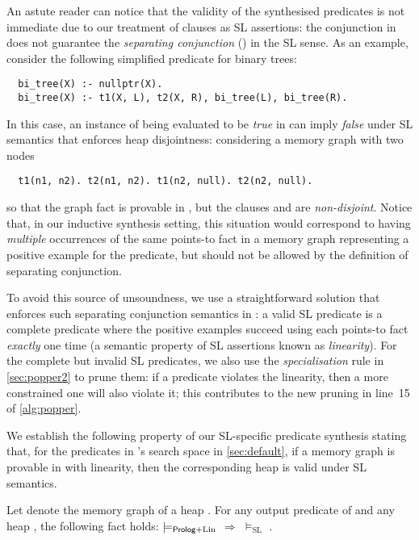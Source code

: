 An astute reader can notice that the validity of the synthesised
predicates is not immediate due to our treatment of \prolog clauses as
SL assertions: the conjunction in \prolog does not guarantee the
\emph{separating conjunction} (\pcode{*}) in the SL sense. As an
example, consider the following simplified \prolog predicate for
binary trees:
%
\begin{verbatim}
  bi_tree(X) :- nullptr(X). 
  bi_tree(X) :- t1(X, L), t2(X, R), bi_tree(L), bi_tree(R).
\end{verbatim}
%
In this case, an instance of  being evaluated to be
\emph{true} in \prolog can imply \emph{false} under SL semantics that
enforces heap disjointness: considering a memory graph with two nodes
%
\begin{verbatim}
  t1(n1, n2). t2(n1, n2). t1(n2, null). t2(n2, null).
\end{verbatim}
%
so that the graph fact  is provable in \prolog, but
the clauses  and  are
\emph{non-disjoint}.
%
Notice that, in our inductive synthesis setting, this situation would
correspond to having \emph{multiple} occurrences of the same points-to
fact in a memory graph representing a positive example for the
predicate, but should not be allowed by the definition of separating
conjunction.

To avoid this source of unsoundness, we use a straightforward solution
that enforces such separating conjunction semantics in \prolog: a
valid SL predicate is a complete \prolog predicate where the positive
examples succeed using each points-to fact \emph{exactly} one time (a
semantic property of SL assertions known as \emph{linearity}).
%
For the complete \prolog but invalid SL predicates, we also use the
\textit{specialisation} rule in \autoref{sec:popper2} to prune them:
if a predicate violates the linearity, then a more constrained one
will also violate it; this contributes to the new pruning in
line~15 of \autoref{alg:popper}.

We establish the following property of our SL-specific predicate
synthesis stating that, for the predicates in \tool's search space in
\autoref{sec:default}, if a memory graph is provable in \prolog with
linearity, then the corresponding heap is valid under SL semantics.

\begin{theorem}[SL Validity]
\label{thm:validity}
Let  denote the memory graph of a heap . For any
output predicate  of \tool and any heap , the
following fact holds: 
%
   $\models_{\textsf{Prolog}+\text{Lin}}$
 $\Rightarrow$  $\models_{\text{SL}}$ .
\end{theorem}




